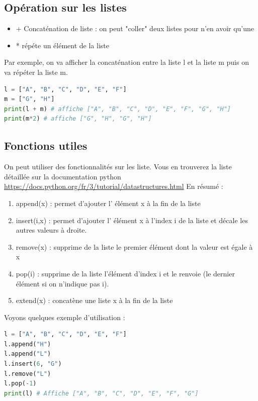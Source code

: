 \subsection*{Opération sur les listes}
\begin{itemize}
    \item + Concaténation de liste : on peut "coller" deux listes pour n'en avoir qu'une
    \item * répéte un élément de la liste
\end{itemize}
\begin{Comprendre}
Par exemple, on va afficher la concaténation entre la liste l et la liste m puis on va répéter la liste m.
\begin{lstlisting}[style=pythonstyle, language=python]
l = ["A", "B", "C", "D", "E", "F"]
m = ["G", "H"]
print(l + m) # affiche ["A", "B", "C", "D", "E", "F", "G", "H"]
print(m*2) # affiche ["G", "H", "G", "H"]
\end{lstlisting}    
\end{Comprendre}
\vspace{-1cm}
    
\subsection*{Fonctions utiles}
On peut utiliser des fonctionnalités sur les liste. Vous en trouverez la liste détaillée sur la documentation python \href{https://docs.python.org/fr/3/tutorial/datastructures.html}{https://docs.python.org/fr/3/tutorial/datastructures.html}
En résumé :
\begin{enumerate}
    \item append(x) : permet d'ajouter l' élément x à la fin de la liste
    \item insert(i,x) :  permet d'ajouter l' élément x à l'index i de la liste et décale les autres valeurs à droite.
    \item remove(x) : supprime de la liste le premier élément dont la valeur est égale à x
    \item pop(i) : supprime de la liste l'élément d'index i et le renvoie (le dernier élément si on n'indique pas i).
    \item extend(x) : concatène une liste x à la fin de la liste
\end{enumerate}
Voyons quelques exemple d'utilisation :
\begin{lstlisting}[style=pythonstyle, language=python]
l = ["A", "B", "C", "D", "E", "F"]
l.append("H")
l.append("L")
l.insert(6, "G")
l.remove("L")
l.pop(-1)
print(l) # Affiche ["A", "B", "C", "D", "E", "F", "G"]
\end{lstlisting}

